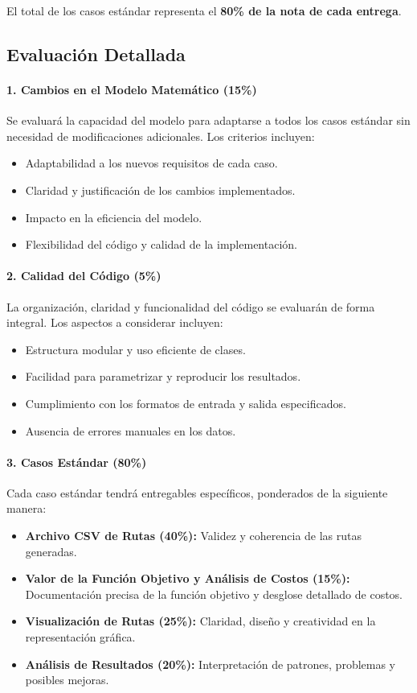 \documentclass[12pt]{article}
\begin{document}
El total de los casos estándar representa el \textbf{80\% de la nota de cada entrega}.

\subsection{Evaluación Detallada}

\paragraph{1. Cambios en el Modelo Matemático (15\%)}
Se evaluará la capacidad del modelo para adaptarse a todos los casos estándar sin necesidad de modificaciones adicionales. Los criterios incluyen:
\begin{itemize}
    \item Adaptabilidad a los nuevos requisitos de cada caso.
    \item Claridad y justificación de los cambios implementados.
    \item Impacto en la eficiencia del modelo.
    \item Flexibilidad del código y calidad de la implementación.
\end{itemize}

\paragraph{2. Calidad del Código (5\%)}
La organización, claridad y funcionalidad del código se evaluarán de forma integral. Los aspectos a considerar incluyen:
\begin{itemize}
    \item Estructura modular y uso eficiente de clases.
    \item Facilidad para parametrizar y reproducir los resultados.
    \item Cumplimiento con los formatos de entrada y salida especificados.
    \item Ausencia de errores manuales en los datos.
\end{itemize}

\paragraph{3. Casos Estándar (80\%)}
Cada caso estándar tendrá entregables específicos, ponderados de la siguiente manera:
\begin{itemize}
    \item \textbf{Archivo CSV de Rutas (40\%):} Validez y coherencia de las rutas generadas.
    \item \textbf{Valor de la Función Objetivo y Análisis de Costos (15\%):} Documentación precisa de la función objetivo y desglose detallado de costos.
    \item \textbf{Visualización de Rutas (25\%):} Claridad, diseño y creatividad en la representación gráfica.
    \item \textbf{Análisis de Resultados (20\%):} Interpretación de patrones, problemas y posibles mejoras.
\end{itemize}
\end{document}
